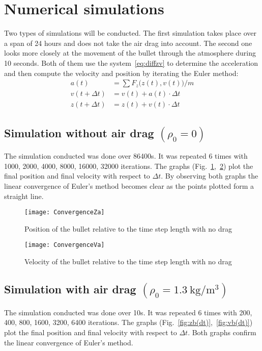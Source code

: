 \documentclass[a4paper,12pt]{article}
\newlength{\plotwidth} %
\begin{document}
\section{Numerical simulations}

Two types of simulations will be conducted. The first simulation takes place over a span of 24 hours and does not take the air drag into account. The second one looks more closely at the movement of the bullet through the atmosphere during 10 seconds. Both of them use the system~\eqref{eq:diffzv} to determine the acceleration and then compute the velocity and position by iterating the Euler method:
\begin{align}
    a(t) &= \sum F_z\bigl(z(t),v(t)\bigr)/m \\
    v(t+\Delta t) &= v(t) + a(t)\cdot\Delta t \\
    z(t+\Delta t) &= z(t) + v(t)\cdot\Delta t
\end{align}

\subsection{Simulation without air drag $(\rho_0 = 0)$}

The simulation conducted was done over 86400s. It was repeated 6 times with 1000, 2000, 4000, 8000, 16000, 32000 iterations. The graphs (Fig.~\ref{fig:za(dt)},~\ref{fig:va(dt)}) plot the final position and final velocity with respect to $\Delta t$. By observing both graphs the linear convergence of Euler's method becomes clear as the points plotted form a straight line.

\begin{figure}[p]
    \centering
    \texttt{[image: ConvergenceZa]}
    \caption{Position of the bullet relative to the time step length with no drag}
    \label{fig:za(dt)}
\end{figure}
\begin{figure}[p]
    \centering
    \texttt{[image: ConvergenceVa]}
    \caption{Velocity of the bullet relative to the time step length with no drag}
    \label{fig:va(dt)}
\end{figure}

\subsection{Simulation with air drag $(\rho_0 = \SI{1,3}{\kilo\gram\per\cubic\meter})$}
The simulation conducted was done over 10s. It was repeated 6 times with 200, 400, 800, 1600, 3200, 6400 iterations. The graphs (Fig.~\ref{fig:zb(dt)},~\ref{fig:vb(dt)}) plot the final position and final velocity with respect to $\Delta t$. Both graphs confirm the linear convergence of Euler's method.
\end{document}
